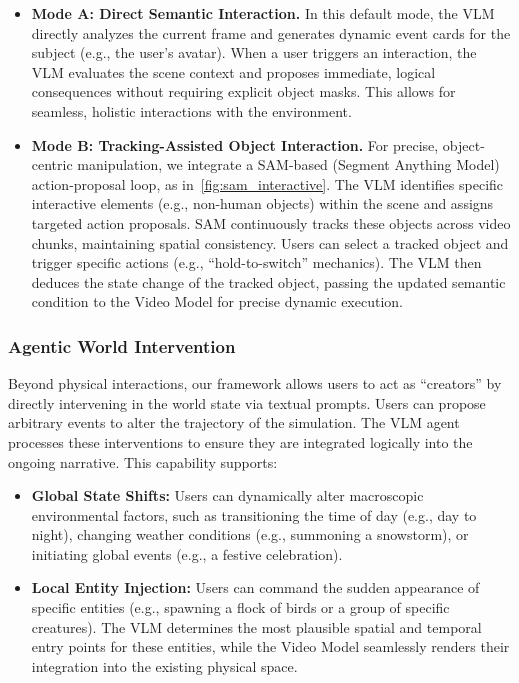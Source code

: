 \begin{itemize}
    \item \textbf{Mode A: Direct Semantic Interaction.} In this default mode, the VLM directly analyzes the current frame and generates dynamic event cards for the subject (e.g., the user's avatar). When a user triggers an interaction, the VLM evaluates the scene context and proposes immediate, logical consequences without requiring explicit object masks. This allows for seamless, holistic interactions with the environment.
    
    \item \textbf{Mode B: Tracking-Assisted Object Interaction.} For precise, object-centric manipulation, we integrate a SAM-based (Segment Anything Model) action-proposal loop, as in~\cref{fig:sam_interactive}. The VLM identifies specific interactive elements (e.g., non-human objects) within the scene and assigns targeted action proposals. SAM continuously tracks these objects across video chunks, maintaining spatial consistency. Users can select a tracked object and trigger specific actions (e.g., ``hold-to-switch'' mechanics). The VLM then deduces the state change of the tracked object, passing the updated semantic condition to the Video Model for precise dynamic execution.
\end{itemize}

\subsubsection{Agentic World Intervention}
Beyond physical interactions, our framework allows users to act as ``creators'' by directly intervening in the world state via textual prompts. Users can propose arbitrary events to alter the trajectory of the simulation. The VLM agent processes these interventions to ensure they are integrated logically into the ongoing narrative. This capability supports:

\begin{itemize}
    \item \textbf{Global State Shifts:} Users can dynamically alter macroscopic environmental factors, such as transitioning the time of day (e.g., day to night), changing weather conditions (e.g., summoning a snowstorm), or initiating global events (e.g., a festive celebration).
    
    \item \textbf{Local Entity Injection:} Users can command the sudden appearance of specific entities (e.g., spawning a flock of birds or a group of specific creatures). The VLM determines the most plausible spatial and temporal entry points for these entities, while the Video Model seamlessly renders their integration into the existing physical space.
\end{itemize}

